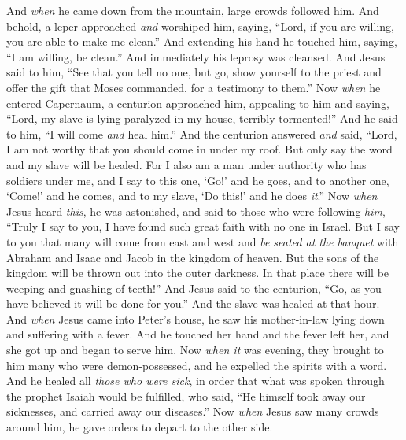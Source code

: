 \begin{biblechapter} %
 And \textit{when} he came down from the mountain, large crowds followed him.
\verse And behold, a leper approached \textit{and} worshiped him, saying, “Lord, if you are willing, you are able to make me clean.”
\verse And extending his hand he touched him, saying, “I am willing, be clean.” And immediately his leprosy was cleansed.
\verse And Jesus said to him, “See that you tell no one, but go, show yourself to the priest and offer the gift that Moses commanded, for a testimony to them.”
 Now \textit{when} he entered Capernaum, a centurion approached him, appealing to him
\verse and saying, “Lord, my slave is lying paralyzed in my house, terribly tormented!”
\verse And he said to him, “I will come \textit{and} heal him.”
\verse And the centurion answered \textit{and} said, “Lord, I am not worthy that you should come in under my roof. But only say the word and my slave will be healed.
\verse For I also am a man under authority who has soldiers under me, and I say to this one, ‘Go!’ and he goes, and to another one, ‘Come!’ and he comes, and to my slave, ‘Do this!’ and he does \textit{it}.”
\verse Now \textit{when} Jesus heard \textit{this}, he was astonished, and said to those who were following \textit{him}, “Truly I say to you, I have found such great faith with no one in Israel.
\verse But I say to you that many will come from east and west and \textit{be seated at the banquet} with Abraham and Isaac and Jacob in the kingdom of heaven.
\verse But the sons of the kingdom will be thrown out into the outer darkness. In that place there will be weeping and gnashing of teeth!”
\verse And Jesus said to the centurion, “Go, as you have believed it will be done for you.” And the slave was healed at that hour.
 And \textit{when} Jesus came into Peter’s house, he saw his mother-in-law lying down and suffering with a fever.
\verse And he touched her hand and the fever left her, and she got up and began to serve him.
\verse Now \textit{when it} was evening, they brought to him many who were demon-possessed, and he expelled the spirits with a word. And he healed all \textit{those who were sick},
\verse in order that what was spoken through the prophet Isaiah would be fulfilled, who said, “He himself took away our sicknesses, 
and carried away our diseases.”
 Now \textit{when} Jesus saw many crowds around him, he gave orders to depart to the other side.

\end{biblechapter}

